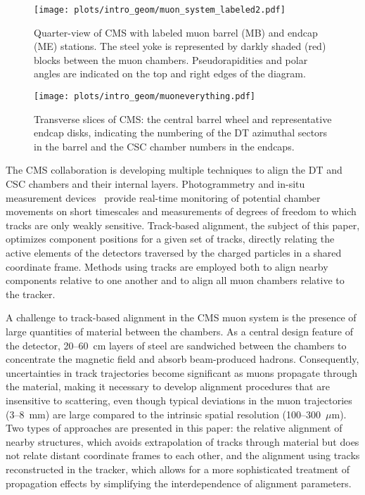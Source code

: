 \documentclass[11pt,twoside,a4paper,cmspaper]{cms-tdr}
\begin{document}
\begin{figure}[p]
\texttt{[image: plots/intro\_geom/muon\_system\_labeled2.pdf]}

\caption{Quarter-view of CMS with labeled muon barrel (MB) and endcap
(ME) stations.  The steel yoke is represented by darkly shaded (red) blocks
between the muon chambers.  Pseudorapidities and polar angles are
indicated on the top and right edges of the diagram. \label{fig:muon_system_labeled}}
\end{figure}

\begin{figure}[p]
\texttt{[image: plots/intro\_geom/muoneverything.pdf]}

\caption{Transverse slices of CMS: the central barrel wheel and
representative endcap disks, indicating the numbering of the DT azimuthal sectors in
the barrel and the CSC chamber numbers in the endcaps. \label{fig:muoneverything}}
\end{figure}

The CMS collaboration is developing multiple techniques to align the
DT and CSC chambers and their internal layers.  Photogrammetry and
in-situ measurement devices~\cite{ref:hardware_alignment} provide
real-time monitoring of potential chamber movements on short
timescales and measurements of degrees of freedom to which tracks are
only weakly sensitive.  Track-based alignment, the subject of this
paper, optimizes component positions for a given set of tracks,
directly relating the active elements of the detectors traversed by
the charged particles in a shared coordinate frame.  Methods using
tracks are employed both to align nearby components relative to one
another and to align all muon chambers relative to the tracker.

A challenge to track-based alignment in the CMS muon system is the
presence of large quantities of material between the chambers.  As a
central design feature of the detector, 20--60~cm layers of steel
are sandwiched between the chambers to concentrate the magnetic field
and absorb beam-produced hadrons.  Consequently, uncertainties in
track trajectories become significant as muons propagate through the
material, making it necessary to develop alignment procedures that are
insensitive to scattering, even though typical deviations in the muon
trajectories (3--8~mm) are large compared to the intrinsic spatial
resolution (100--300~$\mu$m).  Two types of approaches are presented
in this paper: the relative alignment of nearby structures, which avoids
extrapolation of tracks through material but does not relate distant
coordinate frames to each other, and the alignment using tracks
reconstructed in the tracker, which allows for a more sophisticated
treatment of propagation effects by simplifying the interdependence of
alignment parameters.
\end{document}
